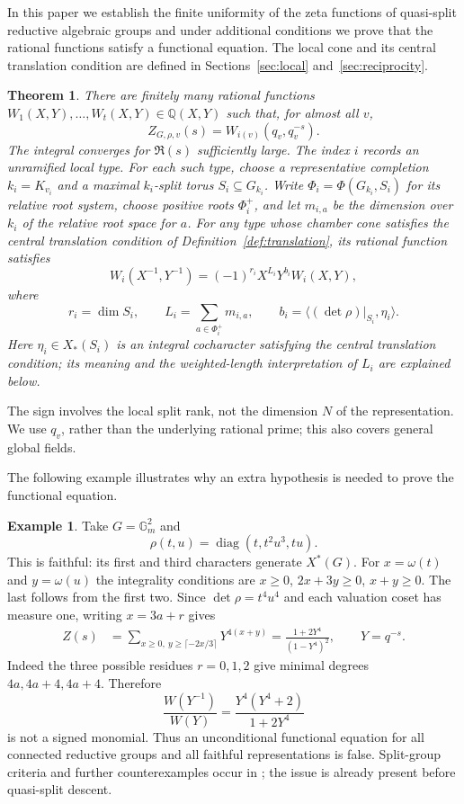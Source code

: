 \documentclass[11pt,a4paper]{article}
\newtheorem{theorem}{Theorem}
\theoremstyle{definition}
\newtheorem{example}[proposition]{Example}
\newcommand{\Q}{\mathbb Q}
\newcommand{\Gm}{\mathbb G_m}
\begin{document}
In this paper we establish the finite uniformity of the zeta functions of quasi-split reductive algebraic groups and under additional conditions we prove that the rational functions satisfy a functional equation. The local cone and
its central translation condition are defined in Sections~\ref{sec:local}
and~\ref{sec:reciprocity}.
\begin{theorem}\label{thm:main}
There are finitely many rational functions
$W_1(X,Y),\ldots,W_t(X,Y)\in\Q(X,Y)$ such that, for almost all $v$,
\[
 Z_{G,\rho,v}(s)=W_{i(v)}(q_v,q_v^{-s}).
\]
The integral converges for $\Re(s)$ sufficiently large.
The index $i$ records an unramified local type. For each such type,
choose a representative completion $k_i=K_{v_i}$ and a maximal
$k_i$-split torus $S_i\subseteq G_{k_i}$. Write
$\Phi_i=\Phi(G_{k_i},S_i)$ for its relative root system, choose
positive roots $\Phi_i^+$, and let $m_{i,a}$ be the dimension over
$k_i$ of the relative root space for $a$.
For any type whose chamber cone satisfies the central
translation condition of Definition~\ref{def:translation}, its rational
function satisfies
\begin{equation}\label{eq:mainfe}
 W_i(X^{-1},Y^{-1})=(-1)^{r_i}X^{L_i}Y^{b_i}W_i(X,Y),
\end{equation}
where
\[
 r_i=\dim S_i,\qquad
 L_i=\sum_{a\in\Phi_i^+}m_{i,a},\qquad
 b_i=\langle(\det\rho)|_{S_i},\eta_i\rangle.
\]
Here $\eta_i\in X_*(S_i)$ is an integral cocharacter satisfying
the central translation condition; its meaning and the weighted-length
interpretation of $L_i$ are explained below.
\end{theorem}
The sign involves the local split rank, not the dimension $N$ of the
representation. We use $q_v$, rather than the underlying rational prime;
this also covers general global fields.

The following example illustrates why an extra hypothesis is needed to prove the functional equation.

\begin{example}
\label{ex:counterexample}
Take $G=\Gm^2$ and
\[
 \rho(t,u)=\operatorname{diag}(t,t^2u^3,tu).
\]
This is faithful: its first and third characters generate $X^*(G)$.
For $x=\omega(t)$ and $y=\omega(u)$ the integrality conditions are
$x\geq0$, $2x+3y\geq0$, $x+y\geq0$. The last follows from the
first two. Since $\det\rho=t^4u^4$ and each valuation coset has
measure one, writing $x=3a+r$ gives
\begin{align*}
 Z(s)&=\sum_{x\geq0,\ y\geq\lceil-2x/3\rceil}Y^{4(x+y)}
      =\frac{1+2Y^4}{(1-Y^4)^2},\qquad Y=q^{-s}.
\end{align*}
Indeed the three possible residues $r=0,1,2$ give minimal degrees
$4a,4a+4,4a+4$. Therefore
\[
 \frac{W(Y^{-1})}{W(Y)}
   =\frac{Y^4(Y^4+2)}{1+2Y^4}
\]
is not a signed monomial. Thus an unconditional functional equation for
all connected reductive groups and all faithful representations is false.
Split-group criteria and further counterexamples occur in
\cite{Berman}; the issue is already present before quasi-split descent.
\end{example}
\end{document}
